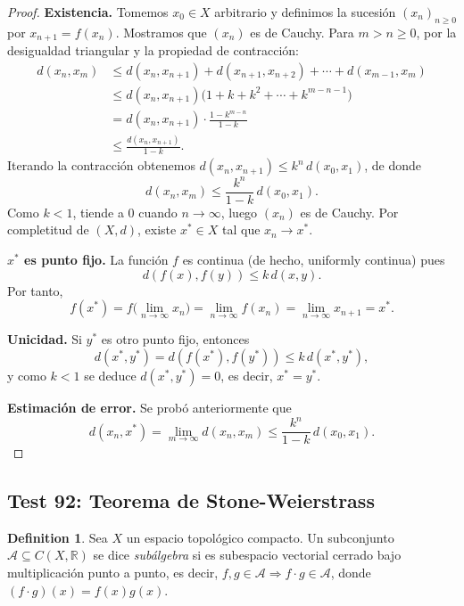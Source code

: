 \documentclass[11pt,a4paper]{article}
\theoremstyle{plain}
\theoremstyle{definition}
\newtheorem{definition}[theorem]{Definition}
\begin{document}
\begin{proof}
\textbf{Existencia.} Tomemos $x_{0}\in X$ arbitrario y definimos la sucesión $(x_{n})_{n\ge0}$ por $x_{n+1}=f(x_{n})$. Mostramos que $(x_{n})$ es de Cauchy. Para $m>n\ge 0$, por la desigualdad triangular y la propiedad de contracción:
\begin{align*}
d(x_{n},x_{m}) &\le d(x_{n},x_{n+1})+d(x_{n+1},x_{n+2})+\cdots+d(x_{m-1},x_{m})\\
&\le d(x_{n},x_{n+1})\bigl(1+k+k^{2}+\cdots+k^{m-n-1}\bigr)\\
&= d(x_{n},x_{n+1})\cdot\frac{1-k^{m-n}}{1-k}\\
&\le \frac{d(x_{n},x_{n+1})}{1-k}.
\end{align*}
Iterando la contracción obtenemos $d(x_{n},x_{n+1})\le k^{n}\,d(x_{0},x_{1})$, de donde
\[
d(x_{n},x_{m})\le \frac{k^{n}}{1-k}\,d(x_{0},x_{1}).
\]
Como $k<1$, tiende a $0$ cuando $n\to\infty$, luego $(x_{n})$ es de Cauchy. Por completitud de $(X,d)$, existe $x^{*}\in X$ tal que $x_{n}\to x^{*}$.

\textbf{$x^{*}$ es punto fijo.} La función $f$ es continua (de hecho, uniformly continua) pues
\[
d(f(x),f(y))\le k\,d(x,y).
\]
Por tanto,
\[
f(x^{*})=f\!\bigl(\lim_{n\to\infty}x_{n}\bigr)=\lim_{n\to\infty}f(x_{n})=\lim_{n\to\infty}x_{n+1}=x^{*}.
\]

\textbf{Unicidad.} Si $y^{*}$ es otro punto fijo, entonces
\[
d(x^{*},y^{*})=d(f(x^{*}),f(y^{*}))\le k\,d(x^{*},y^{*}),
\]
y como $k<1$ se deduce $d(x^{*},y^{*})=0$, es decir, $x^{*}=y^{*}$.

\textbf{Estimación de error.} Se probó anteriormente que
\[
d(x_{n},x^{*})=\lim_{m\to\infty}d(x_{n},x_{m})\le \frac{k^{n}}{1-k}\,d(x_{0},x_{1}).
\]
\end{proof}

\subsection*{Test 92: Teorema de Stone-Weierstrass}

\begin{definition}
Sea $X$ un espacio topológico compacto. Un subconjunto $\mathcal{A}\subseteq C(X,\mathbb{R})$ se dice \emph{subálgebra} si es subespacio vectorial cerrado bajo multiplicación punto a punto, es decir, $f,g\in\mathcal{A}\Rightarrow f\cdot g\in\mathcal{A}$, donde $(f\cdot g)(x)=f(x)g(x)$.
\end{definition}
\end{document}
